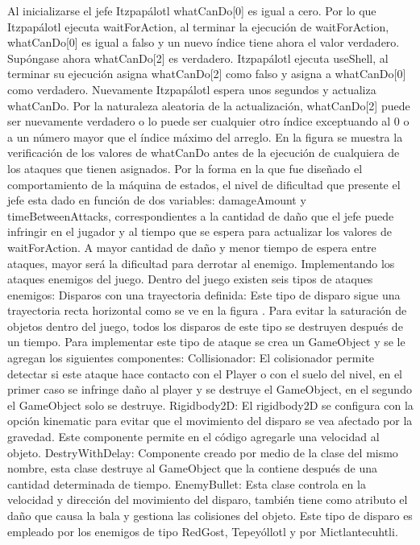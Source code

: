 Al inicializarse el jefe Itzpapálotl whatCanDo[0] es igual a cero. Por lo que Itzpapálotl ejecuta waitForAction, al terminar la ejecución de waitForAction, whatCanDo[0] es igual a falso y un nuevo índice tiene ahora el valor verdadero. Supóngase ahora whatCanDo[2] es verdadero. Itzpapálotl ejecuta useShell, al terminar su ejecución asigna whatCanDo[2] como falso y asigna a whatCanDo[0] como verdadero. Nuevamente Itzpapálotl espera unos segundos y actualiza whatCanDo. Por la naturaleza aleatoria de la actualización, whatCanDo[2] puede ser nuevamente verdadero o lo puede ser cualquier otro índice exceptuando al 0 o a un número mayor que el índice máximo del arreglo. En la figura se muestra la verificación de los valores de whatCanDo antes de la ejecución de cualquiera de los ataques que tienen asignados. 
Por la forma en la que fue diseñado el comportamiento de la máquina de estados, el nivel de dificultad que presente el jefe esta dado en función de dos variables: damageAmount y timeBetweenAttacks, correspondientes a la cantidad de daño que el jefe puede infringir en el jugador y al tiempo que se espera para actualizar los valores de waitForAction. A mayor cantidad de daño y menor tiempo de espera entre ataques, mayor será la dificultad para derrotar al enemigo. 
Implementando los ataques enemigos del juego.
Dentro del juego existen seis tipos de ataques enemigos:
Disparos con una trayectoria definida: Este tipo de disparo sigue una trayectoria recta horizontal como se ve en la figura . Para evitar la saturación de objetos dentro del juego, todos los disparos de este tipo se destruyen después de un tiempo. Para implementar este tipo de ataque se crea un GameObject y se le agregan los siguientes componentes: 
Collisionador: El colisionador permite detectar si este ataque hace contacto con el Player o con el suelo del nivel, en el primer caso se infringe daño al player y se destruye el GameObject, en el segundo el GameObject solo se destruye. 
Rigidbody2D: El rigidbody2D se configura con la opción kinematic para evitar que el movimiento del disparo se vea afectado por la gravedad. Este componente permite en el código agregarle una velocidad al objeto.
DestryWithDelay: Componente creado por medio de la clase del mismo nombre, esta clase destruye al GameObject que la contiene después de una cantidad determinada de tiempo.
EnemyBullet: Esta clase controla en la velocidad y dirección del movimiento del disparo, también tiene como atributo el daño que causa la bala y gestiona las colisiones del objeto.
Este tipo de disparo es empleado por los enemigos de tipo RedGost, Tepeyóllotl y por Mictlantecuhtli.

